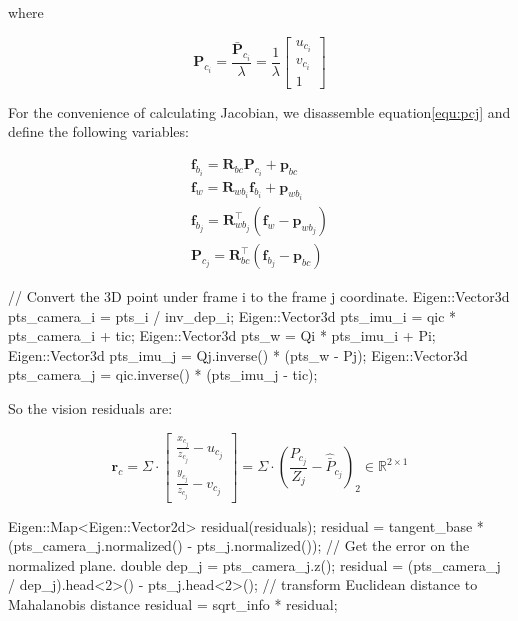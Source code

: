 \documentclass[12pt]{report}   %
\begin{document}
where 

\begin{equation}
	\label{equ:pci}
	\mathbf{P}_{c_i} = \frac{\bar{\mathbf{P}}_{c_{i}}}{\lambda} = 
	\frac{1}{\lambda}
	\left[\begin{array}{c}
	{u_{c_{i}}} \\ {v_{c_{i}}} \\ {1}
	\end{array}\right]
\end{equation}
	
For the convenience of calculating Jacobian, we disassemble equation\ref{equ:pcj} and define the following variables:

\begin{equation}
\label{equ:f_predef}
\begin{array}{l}
{\mathbf{f}_{b_{i}}=\mathbf{R}_{b c} \mathbf{P}_{c_{i}}+\mathbf{p}_{b c}} \\ {\mathbf{f}_{w}=\mathbf{R}_{w b_{i}} \mathbf{f}_{b_{i}}+\mathbf{p}_{w b_{i}}} \\ {\mathbf{f}_{b_{j}}=\mathbf{R}_{w b_{j}}^{\top}\left(\mathbf{f}_{w}-\mathbf{p}_{w b_{j}}\right)} \\
{\mathbf{P}_{c_{j}}=\mathbf{R}_{b c}^{\top}\left(\mathbf{f}_{b_{j}}-\mathbf{p}_{b c}\right)}
\end{array}
\end{equation}

\begin{cppcode}
// Convert the 3D point under frame i to the frame j coordinate.
Eigen::Vector3d pts_camera_i = pts_i / inv_dep_i;
Eigen::Vector3d pts_imu_i    = qic * pts_camera_i + tic;
Eigen::Vector3d pts_w        = Qi * pts_imu_i + Pi;     
Eigen::Vector3d pts_imu_j    = Qj.inverse() * (pts_w - Pj); 
Eigen::Vector3d pts_camera_j = qic.inverse() * (pts_imu_j - tic);
\end{cppcode}

So the vision residuals are:

\begin{equation}
\label{equ:residual_visual}
\mathbf{r}_{c} =
\Sigma \cdot
\left[\begin{array}{c}
{\frac{x_{c_{j}}}{z_{c_{j}}}-u_{c_{j}}} \\ 
{\frac{y_{c_{j}}}{z_{c_{j}}}-v_{c_{j}}}
\end{array}\right] =
\Sigma \cdot
\left(\frac{P_{c_{j}}}{Z_j} - \hat{\bar{P}}_{c_{j}}\right)_2
\in \mathbb{R}^{2 \times 1}
\end{equation}


\begin{cppcode}
Eigen::Map<Eigen::Vector2d> residual(residuals);
residual =  tangent_base * (pts_camera_j.normalized() - pts_j.normalized());
// Get the error on the normalized plane.
double dep_j = pts_camera_j.z();
residual = (pts_camera_j / dep_j).head<2>() - pts_j.head<2>();
// transform Euclidean distance to Mahalanobis distance
residual = sqrt_info * residual; 
\end{cppcode}
\end{document}
